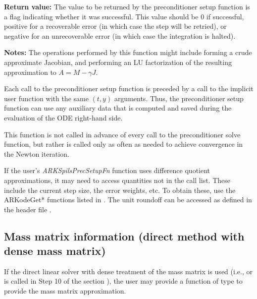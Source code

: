 \documentclass[letterpaper,10pt,english]{sphinxmanual}
\begin{document}
\begin{fulllineitems}
\begin{description}
\begin{itemize}
\end{itemize}

\end{description}

\textbf{Return value:}
The value to be returned by the preconditioner setup
function is a flag indicating whether it was successful. This value
should be 0 if successful, positive for a recoverable error (in
which case the step will be retried), or negative for an
unrecoverable error (in which case the integration is halted).

\textbf{Notes:}  The operations performed by this function might include
forming a crude approximate Jacobian, and performing an LU
factorization of the resulting approximation to \(A = M -
\gamma J\).

Each call to the preconditioner setup function is preceded by a
call to the implicit {\hyperref[c_interface/User_supplied:c.ARKRhsFn]{\emph{}}} user function with the same
\((t,y)\) arguments.  Thus, the preconditioner setup function can
use any auxiliary data that is computed and saved during the
evaluation of the ODE right-hand side.

This function is not called in advance of every call to the
preconditioner solve function, but rather is called only as often
as needed to achieve convergence in the Newton iteration.

If the user's \emph{ARKSpilsPrecSetupFn} function uses difference
quotient approximations, it may need to access quantities not in
the call list. These include the current step size, the error
weights, etc. To obtain these, use the ARKodeGet* functions
listed in {\hyperref[c_interface/User_callable:cinterface-optionaloutputs]{\emph{}}}. The unit roundoff
can be accessed as  defined in the header file
.

\end{fulllineitems}



\subsection{Mass matrix information (direct method with dense mass matrix)}
\label{c_interface/User_supplied:cinterface-densemassfn}\label{c_interface/User_supplied:mass-matrix-information-direct-method-with-dense-mass-matrix}
If the direct linear solver with dense treatment of the mass matrix is
used (i.e., {\hyperref[c_interface/User_callable:c.ARKMassDense]{\emph{}}} or {\hyperref[c_interface/User_callable:c.ARKMassLapackDense]{\emph{}}}
is called in Step 10 of the section {\hyperref[c_interface/Skeleton:cinterface-skeleton]{\emph{}}}), the
user may provide a function of type {\hyperref[c_interface/User_supplied:c.ARKDlsDenseMassFn]{\emph{}}} to
provide the mass matrix approximation.
\end{document}
